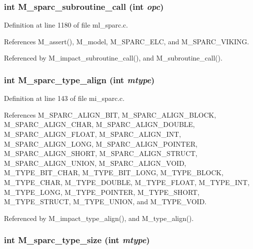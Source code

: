 \subsubsection{\setlength{\rightskip}{0pt plus 5cm}int M\_\-sparc\_\-subroutine\_\-call (int {\em opc})}\label{m__sparc_8h_e82936ab4c7f9d11dd04189341ae5a42}




Definition at line 1180 of file ml\_\-sparc.c.

References M\_\-assert(), M\_\-model, M\_\-SPARC\_\-ELC, and M\_\-SPARC\_\-VIKING.

Referenced by M\_\-impact\_\-subroutine\_\-call(), and M\_\-subroutine\_\-call().
\subsubsection{\setlength{\rightskip}{0pt plus 5cm}int M\_\-sparc\_\-type\_\-align (int {\em mtype})}\label{m__sparc_8h_da02595d4004914b605403aaec629d14}




Definition at line 143 of file mi\_\-sparc.c.

References M\_\-SPARC\_\-ALIGN\_\-BIT, M\_\-SPARC\_\-ALIGN\_\-BLOCK, M\_\-SPARC\_\-ALIGN\_\-CHAR, M\_\-SPARC\_\-ALIGN\_\-DOUBLE, M\_\-SPARC\_\-ALIGN\_\-FLOAT, M\_\-SPARC\_\-ALIGN\_\-INT, M\_\-SPARC\_\-ALIGN\_\-LONG, M\_\-SPARC\_\-ALIGN\_\-POINTER, M\_\-SPARC\_\-ALIGN\_\-SHORT, M\_\-SPARC\_\-ALIGN\_\-STRUCT, M\_\-SPARC\_\-ALIGN\_\-UNION, M\_\-SPARC\_\-ALIGN\_\-VOID, M\_\-TYPE\_\-BIT\_\-CHAR, M\_\-TYPE\_\-BIT\_\-LONG, M\_\-TYPE\_\-BLOCK, M\_\-TYPE\_\-CHAR, M\_\-TYPE\_\-DOUBLE, M\_\-TYPE\_\-FLOAT, M\_\-TYPE\_\-INT, M\_\-TYPE\_\-LONG, M\_\-TYPE\_\-POINTER, M\_\-TYPE\_\-SHORT, M\_\-TYPE\_\-STRUCT, M\_\-TYPE\_\-UNION, and M\_\-TYPE\_\-VOID.

Referenced by M\_\-impact\_\-type\_\-align(), and M\_\-type\_\-align().
\subsubsection{\setlength{\rightskip}{0pt plus 5cm}int M\_\-sparc\_\-type\_\-size (int {\em mtype})}\label{m__sparc_8h_4119eed7e591cd285d0ebb54af296dd8}




